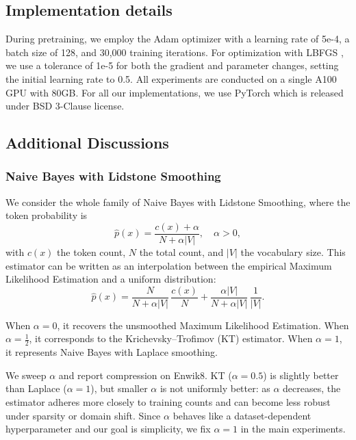 \documentclass[11pt]{article}
\begin{document}
\subsection{Implementation details}
During pretraining, we employ the Adam optimizer \cite{adam} with a learning rate of 5e-4, a batch size of 128, and 30,000 training iterations. 
For optimization with LBFGS \cite{lbfgs}, we use a tolerance of 1e-5 for both the gradient and parameter changes, setting the initial learning rate to 0.5. 
All experiments are conducted on a single A100 GPU with 80GB.
For all our implementations, we use PyTorch\citep{paszke2019pytorch} which is released under BSD 3-Clause license.

\subsection{Additional Discussions}

\subsubsection{Naive Bayes with Lidstone Smoothing}
\label{subsec:lidstone}

We consider the whole family of Naive Bayes with Lidstone Smoothing, where the token probability is
\[
\hat{p}(x) = \frac{c(x) + \alpha}{N + \alpha |V|}, \quad \alpha > 0,
\]
with $c(x)$ the token count, $N$ the total count, and $|V|$ the vocabulary size. This estimator can be written as an interpolation between the empirical Maximum Likelihood Estimation and a uniform distribution:
\[
\hat{p}(x)
= \frac{N}{N+\alpha|V|}\,\frac{c(x)}{N}
+ \frac{\alpha|V|}{N+\alpha|V|}\,\frac{1}{|V|}.
\]

When $\alpha = 0$, it recovers the unsmoothed Maximum Likelihood Estimation. When $\alpha = \tfrac{1}{2}$, it corresponds to the Krichevsky--Trofimov (KT) estimator. When $\alpha = 1$, it represents Naive Bayes with Laplace smoothing.


We sweep $\alpha$ and report compression on Enwik8. KT ($\alpha{=}0.5$) is slightly better than Laplace ($\alpha{=}1$), but smaller $\alpha$ is not uniformly better: as $\alpha$ decreases, the estimator adheres more closely to training counts and can become less robust under sparsity or domain shift. Since $\alpha$ behaves like a dataset-dependent hyperparameter and our goal is simplicity, we fix $\alpha{=}1$ in the main experiments.
\end{document}
